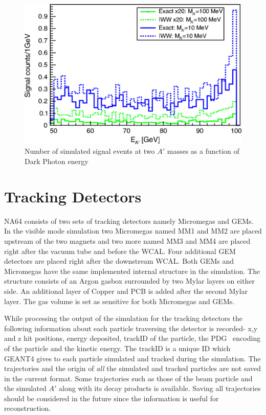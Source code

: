 \begin{figure}[t!]
\centering
\includegraphics[width=12cm]{thesis_figures/IWWvsETL.png}
\caption{Number of simulated signal events at two $A'$ masses as a function of Dark Photon energy~\cite{Gninenko:2017yus}}
\label{fig:ETLvsIWW}
\end{figure}

\section{Tracking Detectors}
NA64 consists of two sets of tracking detectors namely Micromegas and GEMs. In the visible mode simulation two Micromegas named MM1 and MM2 are placed upstream of the two magnets and two more named MM3 and MM4 are placed right after the vacuum tube and before the WCAL. Four additional GEM detectors are placed right after the downstream WCAL. Both GEMs and Micromegas have the same implemented internal structure in the simulation. The structure consists of an Argon gasbox surrounded by two Mylar layers on either side. An additional layer of Copper and PCB is added after the second Mylar layer. The gas volume is set as sensitive for both Micromegas and GEMs.

While processing the output of the simulation for the tracking detectors the following information about each particle traversing the detector is recorded- x,y and z hit positions, energy deposited, trackID of the particle, the PDG~\cite{pdg2010} encoding of the particle and the kinetic energy. The trackID is a unique ID which GEANT4 gives to each particle simulated and tracked during the simulation. The trajectories and the origin of \emph{all} the simulated and tracked particles are not saved in the current format. Some trajectories such as those of the beam particle and the simulated $A'$ along with its decay products is available. Saving all trajectories should be considered in the future since the information is useful for reconstruction.

